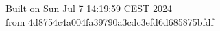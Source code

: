{\noindent Built on Sun Jul  7 14:19:59 CEST 2024} \\ 
 {\noindent from 4d8754c4a004fa39790a3cdc3efd6d685875bfdf}
